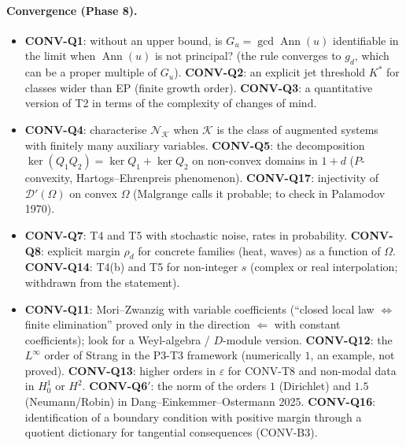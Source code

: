 \documentclass[11pt]{article}
\theoremstyle{plain}
\theoremstyle{definition}
\theoremstyle{remark}
\DeclareMathOperator{\Ann}{Ann}             %
\begin{document}
\paragraph{Convergence (Phase 8).}
\begin{itemize}
\item \textbf{CONV-Q1}: without an upper bound, is $G_u=\gcd\Ann(u)$ identifiable in the limit when $\Ann(u)$ is not principal? (the rule converges to $g_d$, which can be a proper multiple of $G_u$). \textbf{CONV-Q2}: an explicit jet threshold $K^*$ for classes wider than EP (finite growth order). \textbf{CONV-Q3}: a quantitative version of T2 in terms of the complexity of changes of mind.
\item \textbf{CONV-Q4}: characterise $\mathcal N_{\mathcal K}$ when $\mathcal K$ is the class of augmented systems with finitely many auxiliary variables. \textbf{CONV-Q5}: the decomposition $\ker(Q_1Q_2)=\ker Q_1+\ker Q_2$ on non-convex domains in $1+d$ ($P$-convexity, Hartogs--Ehrenpreis phenomenon). \textbf{CONV-Q17}: injectivity of $\mathcal D'(\Omega)$ on convex $\Omega$ (Malgrange calls it probable; to check in Palamodov 1970).
\item \textbf{CONV-Q7}: T4 and T5 with stochastic noise, rates in probability. \textbf{CONV-Q8}: explicit margin $\rho_d$ for concrete families (heat, waves) as a function of $\Omega$. \textbf{CONV-Q14}: T4(b) and T5 for non-integer $s$ (complex or real interpolation; withdrawn from the statement).
\item \textbf{CONV-Q11}: Mori--Zwanzig with variable coefficients (``closed local law $\iff$ finite elimination'' proved only in the direction $\Leftarrow$ with constant coefficients); look for a Weyl-algebra / $D$-module version. \textbf{CONV-Q12}: the $L^\infty$ order of Strang in the P3-T3 framework (numerically $1$, an example, not proved). \textbf{CONV-Q13}: higher orders in $\varepsilon$ for CONV-T8 and non-modal data in $H^1_0$ or $H^2$. \textbf{CONV-Q6$'$}: the norm of the orders $1$ (Dirichlet) and $1.5$ (Neumann/Robin) in Dang--Einkemmer--Ostermann 2025. \textbf{CONV-Q16}: identification of a boundary condition with positive margin through a quotient dictionary for tangential consequences (CONV-B3).
\end{itemize}
\end{document}
